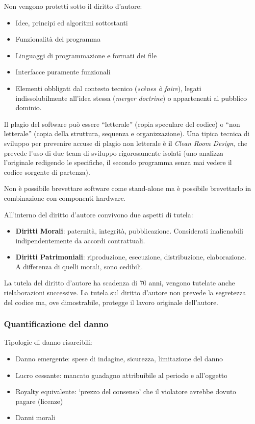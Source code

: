 \documentclass[11pt,a4paper]{article}
\begin{document}
Non vengono protetti sotto il diritto d'autore:
\begin{itemize}
    \item Idee, principi ed algoritmi sottostanti
    \item Funzionalità del programma
    \item Linguaggi di programmazione e formati dei file
    \item Interfacce puramente funzionali
    \item Elementi obbligati dal contesto tecnico (\textit{scènes à faire}), legati indissolubilmente all'idea stessa (\textit{merger doctrine}) o appartenenti al pubblico dominio.
\end{itemize}

Il plagio del software può essere ``letterale'' (copia speculare del codice) o ``non letterale'' (copia della struttura, sequenza e organizzazione). Una tipica tecnica di sviluppo per prevenire accuse di plagio non letterale è il \textit{Clean Room Design}, che prevede l'uso di due team di sviluppo rigorosamente isolati (uno analizza l'originale redigendo le specifiche, il secondo programma senza mai vedere il codice sorgente di partenza).

Non è possibile brevettare software come stand-alone ma è possibile brevettarlo in combinazione con componenti hardware.

All'interno del diritto d'autore convivono due aspetti di tutela:
\begin{itemize}
    \item \textbf{Diritti Morali}: paternità, integrità, pubblicazione. Considerati inalienabili indipendentemente da accordi contrattuali.
    \item \textbf{Diritti Patrimoniali}: riproduzione, esecuzione, distribuzione, elaborazione. A differenza di quelli morali, sono cedibili.
\end{itemize}

La tutela del diritto d'autore ha scadenza di 70 anni, vengono tutelate anche rielaborazioni successive.
La tutela sul diritto d'autore non prevede la segretezza del codice ma, ove dimostrabile, protegge il lavoro originale dell'autore.

\subsubsection{Quantificazione del danno}
Tipologie di danno risarcibili:
\begin{itemize}
    \item Danno emergente: spese di indagine, sicurezza, limitazione del danno
    \item Lucro cessante: mancato guadagno attribuibile al periodo e all'oggetto
    \item Royalty equivalente: `prezzo del consenso' che il violatore avrebbe dovuto pagare (licenze)
    \item Danni morali
\end{itemize}
\end{document}
